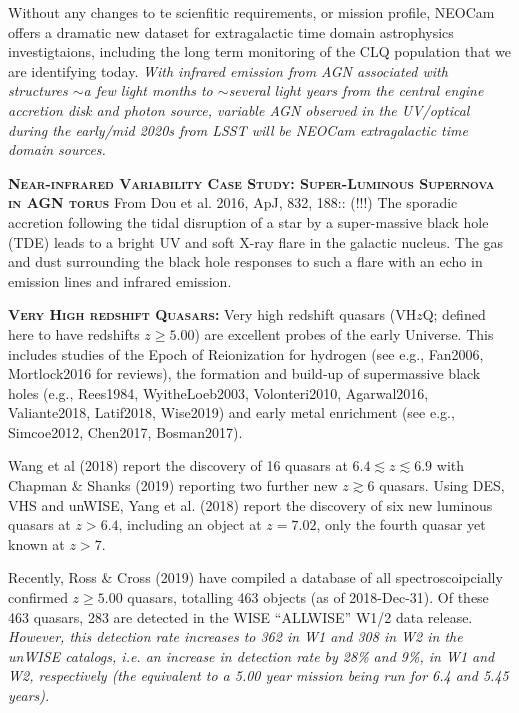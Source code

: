 \documentclass[12pt]{article}
\begin{document}
\smallskip
\smallskip
\noindent
Without any changes to te scienfitic requirements, or mission profile, NEOCam offers 
a dramatic new dataset for extragalactic time domain astrophysics investigtaions, including
the long term monitoring of the CLQ population that we are identifying today.
{\it With infrared emission from AGN associated with structures $\sim$a few light months to $\sim$several light years from the central engine accretion disk and photon source, variable AGN observed in the UV/optical during the early/mid 2020s from LSST will be NEOCam extragalactic time domain sources.}


\smallskip
\smallskip
\noindent
\textbf{\textsc{Near-infrared Variability Case Study: Super-Luminous Supernova in AGN torus}} 
From Dou et al. 2016, ApJ, 832, 188:: (!!!) 
The sporadic accretion following the tidal disruption of a star by a
super-massive black hole (TDE) leads to a bright UV and soft X-ray
flare in the galactic nucleus. The gas and dust surrounding the black
hole responses to such a flare with an echo in emission lines and
infrared emission.

\smallskip
\smallskip
\noindent
\textbf{\textsc{Very High redshift Quasars:}} 
Very high redshift quasars (VH$z$Q; defined here to have redshifts $z\geq5.00$) are excellent probes of the early Universe. This includes studies of the Epoch of Reionization for hydrogen (see e.g., Fan2006, Mortlock2016 for reviews), the formation and build-up of supermassive black holes (e.g., Rees1984, WyitheLoeb2003, Volonteri2010, Agarwal2016, Valiante2018, Latif2018, Wise2019) and early metal enrichment (see e.g., Simcoe2012, Chen2017, Bosman2017).

\smallskip
\smallskip
\noindent
Wang et al (2018) 
report the discovery of 16 quasars at $6.4\lesssim z \lesssim 6.9$ 
with Chapman \& Shanks (2019) reporting two further new $z\gtrsim6$ quasars. 
Using DES, VHS and unWISE, Yang et al. (2018) report the discovery of six new luminous quasars at $z > 6.4$, 
including an object at $z = 7.02$, only the fourth quasar yet known at $z > 7$. 

\smallskip
\smallskip
\noindent
Recently, Ross \& Cross (2019) have compiled a database of all 
spectroscoipcially confirmed $z\geq5.00$ quasars, totalling 463 objects (as of 
2018-Dec-31). Of these 463 quasars, 283 are detected in the WISE ``ALLWISE'' W1/2 
data release. {\it However, this detection rate increases to 362 in W1 and 308 in W2 
in the unWISE catalogs, i.e. an increase in detection rate by 28\% and 9\%, in W1 and W2, 
respectively (the equivalent to a 5.00 year mission being run for 6.4 and 5.45 years).}
\end{document}
